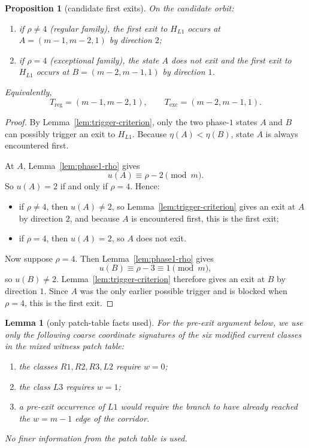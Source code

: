 \documentclass[11pt]{article}
\newtheorem{proposition}[theorem]{Proposition}
\newtheorem{lemma}[theorem]{Lemma}
\begin{document}
\begin{proposition}[candidate first exits]\label{prop:candidate-first-exits}
On the candidate orbit:
\begin{enumerate}[label=\textup{(\arabic*)},leftmargin=2.5em]
\item if $\rho\neq 4$ (regular family), the first exit to $H_{L1}$ occurs at
      $A=(m-1,m-2,1)$ by direction $2$;
\item if $\rho=4$ (exceptional family), the state $A$ does not exit and the
      first exit to $H_{L1}$ occurs at $B=(m-2,m-1,1)$ by direction $1$.
\end{enumerate}
Equivalently,
\[
T_{\mathrm{reg}}=(m-1,m-2,1),
\qquad
T_{\mathrm{exc}}=(m-2,m-1,1).
\]
\end{proposition}

\begin{proof}
By Lemma~\ref{lem:trigger-criterion}, only the two phase-$1$ states $A$ and $B$
can possibly trigger an exit to $H_{L1}$.
Because $\eta(A)<\eta(B)$, state $A$ is always encountered first.

At $A$, Lemma~\ref{lem:phase1-rho} gives
\[
 u(A)\equiv \rho-2 \pmod m.
\]
So $u(A)=2$ if and only if $\rho=4$.
Hence:
\begin{itemize}[leftmargin=2em]
\item if $\rho\neq 4$, then $u(A)\neq 2$, so Lemma~\ref{lem:trigger-criterion}
      gives an exit at $A$ by direction $2$, and because $A$ is encountered
      first, this is the first exit;
\item if $\rho=4$, then $u(A)=2$, so $A$ does not exit.
\end{itemize}

Now suppose $\rho=4$.
Then Lemma~\ref{lem:phase1-rho} gives
\[
 u(B)\equiv \rho-3\equiv 1 \pmod m,
\]
so $u(B)\neq 2$.
Lemma~\ref{lem:trigger-criterion} therefore gives an exit at $B$ by direction
$1$.
Since $A$ was the only earlier possible trigger and is blocked when $\rho=4$,
this is the first exit.
\end{proof}

\begin{lemma}[only patch-table facts used]\label{lem:patch-signatures}
For the pre-exit argument below, we use only the following coarse coordinate
signatures of the six modified current classes in the mixed witness patch table:
\begin{enumerate}[label=\textup{(\arabic*)},leftmargin=2.5em]
\item the classes $R1,R2,R3,L2$ require $w=0$;
\item the class $L3$ requires $w=1$;
\item a pre-exit occurrence of $L1$ would require the branch to have already
      reached the $w=m-1$ edge of the corridor.
\end{enumerate}
No finer information from the patch table is used.
\end{lemma}
\end{document}
